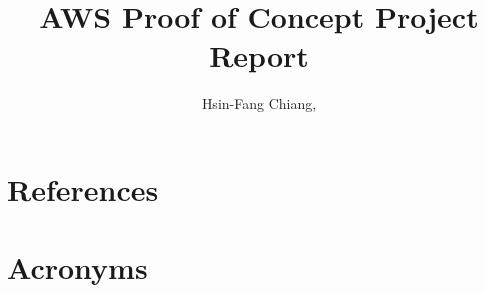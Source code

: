 \documentclass[DM,authoryear,toc]{lsstdoc}
\title{AWS Proof of Concept Project Report}
\author{
Hsin-Fang Chiang,
}
\date{\vcsDate}
\begin{document}
\mkshorttitle



\appendix
%
\section{References} \label{sec:bib}


\section{Acronyms} \label{sec:acronyms}
%
\end{document}
